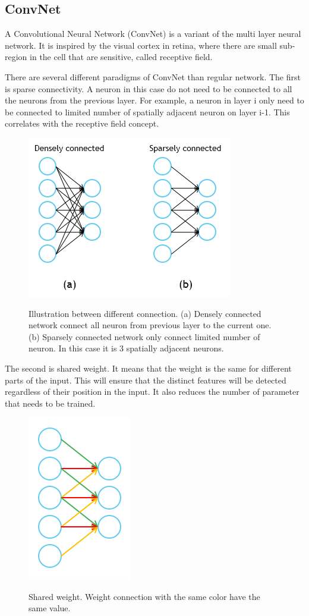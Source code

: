 \documentclass[a4paper,11pt]{kth-mag}
\begin{document}
\subsection{ConvNet}A Convolutional Neural Network (ConvNet) is a variant of the multi layer neural network. It is inspired by the visual cortex in retina, where there are small sub-region in the cell that are sensitive, called receptive field.

There are several different paradigms of ConvNet than regular network.
The first is sparse connectivity. A neuron in this case do not need to be connected to all the neurons from the previous layer. For example, a neuron in layer i only need to be connected to limited number of spatially adjacent neuron on layer i-1. This correlates with the receptive field concept.

\begin{figure}
\centering
\includegraphics[scale=0.5]{image/sparse.png}
\label{fig:sparse}
\caption{Illustration between different connection. (a) Densely connected network connect all neuron from previous layer to the current one. (b) Sparsely connected network only connect limited number of neuron. In this case it is 3 spatially adjacent neurons.}
\end{figure}

The second is shared weight. It means that the weight is the same for different parts of the input. This will ensure that the distinct features will be detected regardless of their position in the input. It also reduces the number of parameter that needs to be trained.

\begin{figure}
\centering
\includegraphics[scale=0.5]{image/shared.png}
\label{fig:shared}
\caption{Shared weight. Weight connection with the same color have the same value.}
\end{figure}
\end{document}
